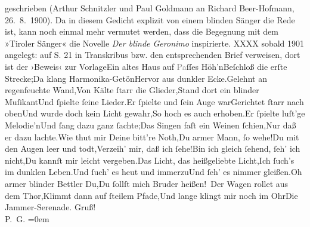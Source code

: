 \begin{ledgroupsized}[t]{13cm}
{{{                        geschrieben (Arthur Schnitzler und Paul Goldmann an Richard Beer-Hofmann,
                    26. 8. 1900). Da in diesem
                           Gedicht explizit
                        von einem blinden Sänger die Rede ist, kann noch einmal mehr vermutet
                        werden, dass die Begegnung mit dem »Tiroler Sänger« die Novelle \emph{Der
                           blinde Geronimo} inspirierte. XXXX sobald 1901 angelegt: auf S. 21 in
                        Transkribus bzw. den entsprechenden Brief verweisen, dort ist der ›Beweis‹
                        zur Vorlage}}}\label{K_L02928-1h}\stanzaend{}\stanza{}Ein altes Haus auf \textcolor{gray}{Pa}ſſes Höh’n\newverse{}Beſchloß die erſte Strecke;\newverse{}Da klang Harmonika-Getön\newverse{}Hervor aus dunkler Ecke.\stanzaend{}\stanza{}Gelehnt an regenfeuchte Wand,\newverse{}Von Kälte ſtarr die Glieder,\newverse{}Stand dort ein blinder Muſikant\newverse{}Und ſpielte ſeine Lieder.\stanzaend{}\stanza{}Er ſpielte und ſein Auge war\newverse{}Gerichtet ſtarr nach oben\newverse{}Und wurde doch kein Licht gewahr,\newverse{}So hoch es auch erhoben.\stanzaend{}\stanza{}{\pb}Er ſpielte luſt’ge Melodie’n\newverse{}Und ſang dazu ganz ſachte;\newverse{}Das Singen faſt ein Weinen ſchien,\newverse{}Nur daß er dazu lachte.\stanzaend{}\stanza{}Wie thut mir Deine bitt’re Noth,\newverse{}Du armer Mann, ſo wehe!\newverse{}Du mit den Augen leer und todt,\newverse{}Verzeih’ mir, daß ich ſehe!\stanzaend{}\stanza{}Bin ich gleich ſehend, ſeh’ ich  nicht,\newverse{}Du kannſt mir leicht vergeben.\newverse{}Das Licht, das heißgeliebte Licht,\newverse{}Ich ſuch’s im dunklen Leben.\stanzaend{}\stanza{}Und ſuch’ es heut und immerzu\newverse{}Und ſeh’ es nimmer gleißen.\newverse{}Oh armer blinder Bettler Du,\newverse{}Du ſollſt mich Bruder heißen! {\dotssix}\stanzaend{}\stanza{}Der Wagen rollet aus dem Thor,\newverse{}Klimmt dann auf ſteilem Pfade,\newverse{}Und lange klingt mir noch im Ohr\newverse{}Die Jammer-Serenade.\stanzaend{}\pstart
           Gruß! {\\[\baselineskip]}\spacefill\mbox{P. G.}\pend
           \leftskip=0em{}
         
         \endnumbering{}\end{ledgroupsized}\begin{anhang}\end{anhang}\newcommand{\dateiname}{L02928}\newcommand{\titel}{Paul Goldmann an Arthur Schnitzler, 28. 8. [1900]}\newcommand{\editorInnen}{Martin Anton Müller und Laura Untner}
      